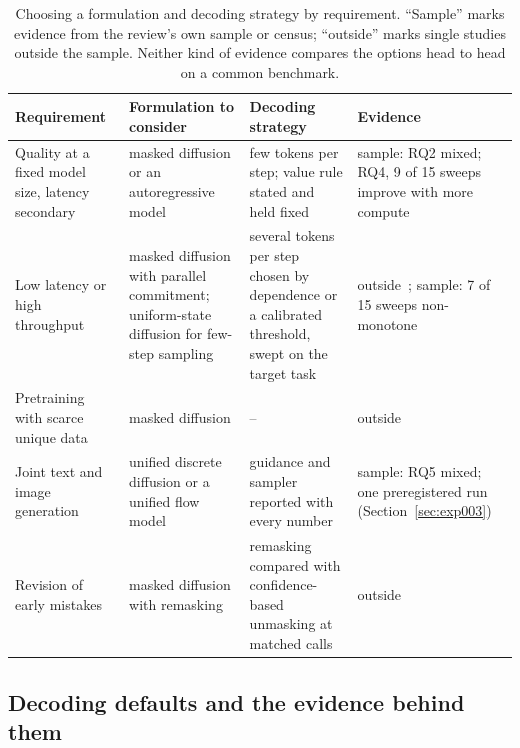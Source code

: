 \begin{table}[t]
\caption{Choosing a formulation and decoding strategy by requirement. ``Sample'' marks evidence from the review's own sample or census; ``outside'' marks single studies outside the sample. Neither kind of evidence compares the options head to head on a common benchmark.}
\label{tab:framework}
\footnotesize
\begin{tabular}{@{}p{2.6cm}p{3.3cm}p{4.0cm}p{3.4cm}@{}}
\toprule
Requirement & Formulation to consider & Decoding strategy & Evidence \\
\midrule
Quality at a fixed model size, latency secondary & masked diffusion or an autoregressive model & few tokens per step; value rule stated and held fixed & sample: RQ2 mixed; RQ4, 9 of 15 sweeps improve with more compute \\
Low latency or high throughput & masked diffusion with parallel commitment; uniform-state diffusion for few-step sampling & several tokens per step chosen by dependence or a calibrated threshold, swept on the target task & outside~\cite{arXiv:2604.02560,arXiv:2605.24697,arXiv:2602.15014}; sample: 7 of 15 sweeps non-monotone \\
Pretraining with scarce unique data & masked diffusion & -- & outside~\cite{arXiv:2507.15857,arXiv:2511.03276} \\
Joint text and image generation & unified discrete diffusion or a unified flow model & guidance and sampler reported with every number & sample: RQ5 mixed; one preregistered run (Section~\ref{sec:exp003}) \\
Revision of early mistakes & masked diffusion with remasking & remasking compared with confidence-based unmasking at matched calls & outside~\cite{arXiv:2606.12232} \\
\bottomrule
\end{tabular}
\end{table}

\subsection{Decoding defaults and the evidence behind them}
\label{sec:practice-defaults}

